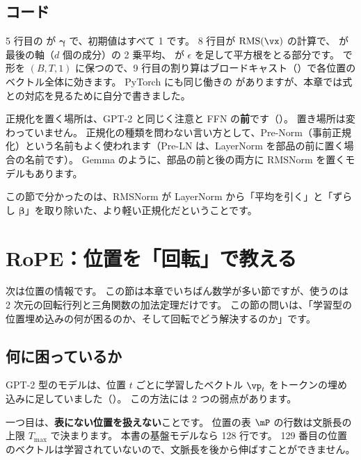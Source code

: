 \subsection*{コード}


5 行目の  が $\bm{\gamma}$ で、初期値はすべて 1 です。
8 行目が $\mathrm{RMS}(\vx)$ の計算で、 が最後の軸（$d$ 個の成分）の 2 乗平均、 が $\epsilon$ を足して平方根をとる部分です。
 で形を $(B,T,1)$ に保つので、9 行目の割り算はブロードキャスト（）で各位置のベクトル全体に効きます。
PyTorch にも同じ働きの  がありますが、本章では式との対応を見るために自分で書きました。

正規化を置く場所は、GPT-2 と同じく注意と FFN の\textbf{前}です（）。
置き場所は変わっていません。
正規化の種類を問わない言い方として、Pre-Norm（事前正規化）という名前もよく使われます（Pre-LN は、LayerNorm を部品の前に置く場合の名前です）。
Gemma のように、部品の前と後の両方に RMSNorm を置くモデルもあります。

この節で分かったのは、RMSNorm が LayerNorm から「平均を引く」と「ずらし $\bm\beta$」を取り除いた、より軽い正規化だということです。

\section{RoPE：位置を「回転」で教える}\label{sec:ma-rope}

次は位置の情報です。
この節は本章でいちばん数学が多い節ですが、使うのは 2 次元の回転行列と三角関数の加法定理だけです。
この節の問いは、「学習型の位置埋め込みの何が困るのか、そして回転でどう解決するのか」です。

\subsection*{何に困っているか}

GPT-2 型のモデルは、位置 $t$ ごとに学習したベクトル $\vp_t$ をトークンの埋め込みに足していました（）。
この方法には 2 つの弱点があります。

一つ目は、\textbf{表にない位置を扱えない}ことです。
位置の表 $\mP$ の行数は文脈長の上限 $T_{\max}$ で決まります。
本書の基盤モデルなら 128 行です。
129 番目の位置のベクトルは学習されていないので、文脈長を後から伸ばすことができません。

